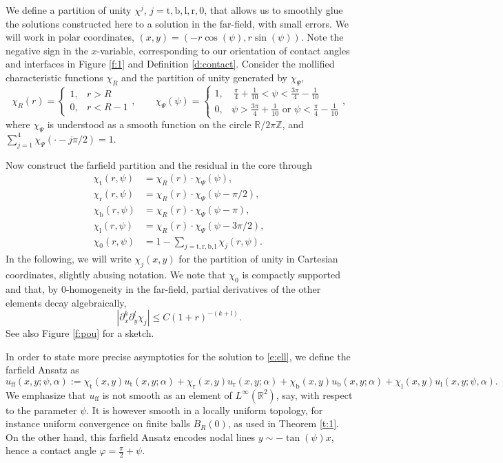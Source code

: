\documentclass[10pt]{article}
\newcommand{\R}{\mathbb{R}}
\newcommand{\Z}{\mathbb{Z}}
\renewcommand{\leq}{\leqslant}
\begin{document}
We define a partition of unity $\chi^j$, $j=\mathrm{t,b,l,r,0}$, that allows us to smoothly glue the solutions constructed here to a solution in the far-field, with small errors. We will work in polar coordinates, $(x,y)=(-r\cos(\psi),r\sin(\psi))$. Note the negative sign in the $x$-variable, corresponding to our orientation of contact angles and interfaces in Figure \ref{f:1} and Definition \ref{d:contact}. Consider the  mollified characteristic functions $\chi_R$ and the partition of unity generated by $\chi_\Psi$, 
\[
\chi_R(r)=\left\{\begin{array}{ll} 1,& r>R\\ 0,&r<R-1\end{array}\right.,\qquad 
\chi_\Psi(\psi)=\displaystyle{\left\{\begin{array}{ll} 1,& \
\frac{\pi}{4}+\frac{1}{10}<\psi<\frac{3\pi}{4}-\frac{1}{10}\\ 0,&\psi>\frac{3\pi}{4}+\frac{1}{10} \mbox{ or } \psi<\frac{\pi}{4}-\frac{1}{10}\end{array}\right.,}
\]
where $\chi_\Psi$ is understood as a smooth function on the circle $\R/2\pi\Z$, and $\sum_{j=1}^4\chi_\Psi(\cdot -j\pi/2)=1$. 

Now construct the farfield partition and the residual in the core through
\begin{align}
\chi_\mathrm{t}(r,\psi)&=\chi_R(r)\cdot \chi_\Psi(\psi),\nonumber\\
\chi_\mathrm{r}(r,\psi)&=\chi_R(r)\cdot \chi_\Psi(\psi-\pi/2),\nonumber\\
\chi_\mathrm{b}(r,\psi)&=\chi_R(r)\cdot \chi_\Psi(\psi-\pi),\nonumber\\
\chi_\mathrm{l}(r,\psi)&=\chi_R(r)\cdot \chi_\Psi(\psi-3\pi/2),\nonumber\\
\chi_0(r,\psi)&=1-\sum_{j=\mathrm{t,r,b,l}}\chi_j(r,\psi).\label{e:pou}
\end{align}
In the following, we will write $\chi_j(x,y)$ for the partition of unity in Cartesian coordinates, slightly abusing notation. We note that $\chi_0$ is compactly supported and that, by 0-homogeneity in the far-field, partial derivatives of the other elements decay algebraically, 
\begin{equation}\label{e:alg}
|\partial^k_x\partial^l_y \chi_j|\leq C (1+r)^{-(k+l)}.
\end{equation}
See also Figure \ref{f:pou} for a sketch. 

In order to state more precise asymptotics for the solution to \eqref{e:ell}, we define the farfield Ansatz as 
\begin{equation}\label{e:ff}
u_\mathrm{ff}(x,y;\psi,\alpha):=\chi_\mathrm{t}(x,y)u_\mathrm{t}(x,y;\alpha)+\chi_\mathrm{r}(x,y)u_\mathrm{r}(x,y;\alpha)+\chi_\mathrm{b}(x,y)u_\mathrm{b}(x,y;\alpha)+\chi_\mathrm{l}(x,y)u_\mathrm{l}(x,y;\psi,\alpha).
\end{equation}
We emphasize that $u_\mathrm{ff}$ is not smooth as an element of $L^\infty(\R^2)$, say, with respect to the parameter $\psi$. It is however smooth in a locally uniform topology, for instance uniform convergence on finite balls $B_R(0)$, as used in Theorem \ref{t:1}.  On the other hand, this farfield Ansatz encodes nodal lines $y\sim -\tan(\psi) x$, hence a contact angle $\varphi=\frac{\pi}{2}+\psi$.
\end{document}
